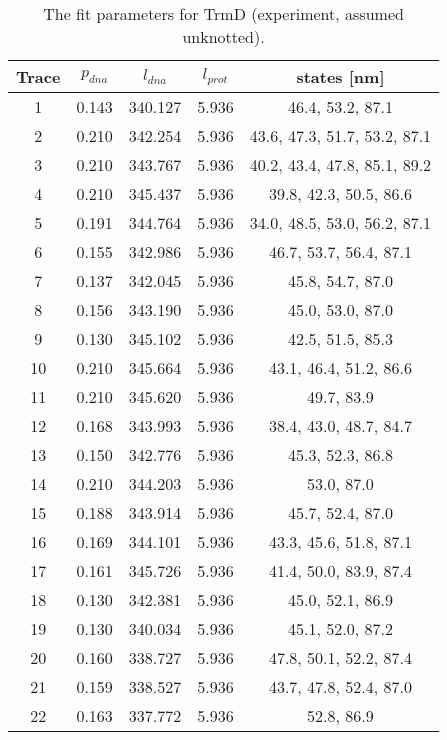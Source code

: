 \begin{table}
    \tiny
    \centering
    \caption{The fit parameters for TrmD (experiment, assumed unknotted).}
    \label{tab:trmd-fit-parameters-exp-unknotted}
    \begin{tabular}{c|c|c|c|c}
        \textbf{Trace} & $p_{dna}$ & $l_{dna}$ & $l_{prot}$ & states [nm]\\\hline
        1 & 0.143 & 340.127 & 5.936 & 46.4, 53.2, 87.1\\
        2 & 0.210 & 342.254 & 5.936 & 43.6, 47.3, 51.7, 53.2, 87.1\\
        3 & 0.210 & 343.767 & 5.936 & 40.2, 43.4, 47.8, 85.1, 89.2\\
        4 & 0.210 & 345.437 & 5.936 & 39.8, 42.3, 50.5, 86.6\\
        5 & 0.191 & 344.764 & 5.936 & 34.0, 48.5, 53.0, 56.2, 87.1\\
        6 & 0.155 & 342.986 & 5.936 & 46.7, 53.7, 56.4, 87.1\\
        7 & 0.137 & 342.045 & 5.936 & 45.8, 54.7, 87.0\\
        8 & 0.156 & 343.190 & 5.936 & 45.0, 53.0, 87.0\\
        9 & 0.130 & 345.102 & 5.936 & 42.5, 51.5, 85.3\\
        10 & 0.210 & 345.664 & 5.936 & 43.1, 46.4, 51.2, 86.6\\
        11 & 0.210 & 345.620 & 5.936 & 49.7, 83.9\\
        12 & 0.168 & 343.993 & 5.936 & 38.4, 43.0, 48.7, 84.7\\
        13 & 0.150 & 342.776 & 5.936 & 45.3, 52.3, 86.8\\
        14 & 0.210 & 344.203 & 5.936 & 53.0, 87.0\\
        15 & 0.188 & 343.914 & 5.936 & 45.7, 52.4, 87.0\\
        16 & 0.169 & 344.101 & 5.936 & 43.3, 45.6, 51.8, 87.1\\
        17 & 0.161 & 345.726 & 5.936 & 41.4, 50.0, 83.9, 87.4\\
        18 & 0.130 & 342.381 & 5.936 & 45.0, 52.1, 86.9\\
        19 & 0.130 & 340.034 & 5.936 & 45.1, 52.0, 87.2\\
        20 & 0.160 & 338.727 & 5.936 & 47.8, 50.1, 52.2, 87.4\\
        21 & 0.159 & 338.527 & 5.936 & 43.7, 47.8, 52.4, 87.0\\
        22 & 0.163 & 337.772 & 5.936 & 52.8, 86.9\\

\end{tabular}
\end{table}
